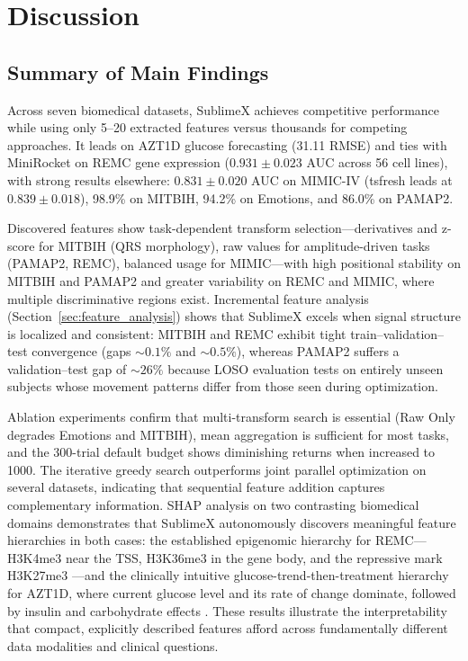 \documentclass[times, review, 10pt]{elsarticle}
\begin{document}
\section{Discussion}

\subsection{Summary of Main Findings}

Across seven biomedical datasets, SublimeX achieves competitive
performance while using only 5--20 extracted features versus
thousands for competing approaches. It leads on AZT1D glucose
forecasting (31.11 RMSE) and ties with MiniRocket on REMC gene
expression ($0.931 \pm 0.023$ AUC across 56 cell lines), with
strong results elsewhere: $0.831 \pm 0.020$ AUC on MIMIC-IV (tsfresh leads at $0.839 \pm 0.018$),
98.9\% on MITBIH, 94.2\% on Emotions, and 86.0\% on PAMAP2.

Discovered features show task-dependent
transform selection---derivatives and z-score for MITBIH (QRS
morphology), raw values for amplitude-driven tasks (PAMAP2, REMC),
balanced usage for MIMIC---with high positional stability on
MITBIH and PAMAP2 and greater variability on REMC and MIMIC, where
multiple discriminative regions exist. Incremental feature analysis
(Section~\ref{sec:feature_analysis}) shows that SublimeX excels
when signal structure is localized and consistent: MITBIH and REMC
exhibit tight train--validation--test convergence (gaps
${\sim}0.1\%$ and ${\sim}0.5\%$), whereas PAMAP2 suffers a
validation--test gap of ${\sim}26\%$ because LOSO evaluation tests
on entirely unseen subjects whose movement patterns differ from
those seen during optimization.

Ablation experiments confirm that multi-transform search is
essential (Raw Only degrades Emotions and MITBIH), mean aggregation
is sufficient for most tasks, and the 300-trial default budget
shows diminishing returns when increased to 1000. The iterative
greedy search outperforms joint parallel optimization on several
datasets, indicating that sequential feature addition captures
complementary information. SHAP analysis on two contrasting
biomedical domains demonstrates that SublimeX autonomously
discovers meaningful feature hierarchies in both cases: the
established epigenomic hierarchy for REMC---H3K4me3 near the
TSS, H3K36me3 in the gene body, and the repressive mark H3K27me3
\cite{karlic2010histone, howe2017h3k4me3}---and the clinically
intuitive glucose-trend-then-treatment hierarchy for AZT1D, where
current glucose level and its rate of change dominate, followed by
insulin and carbohydrate effects
\cite{khamesian2025azt1d}. These results illustrate the
interpretability that compact, explicitly described features
afford across fundamentally different data modalities and clinical
questions.
\end{document}
